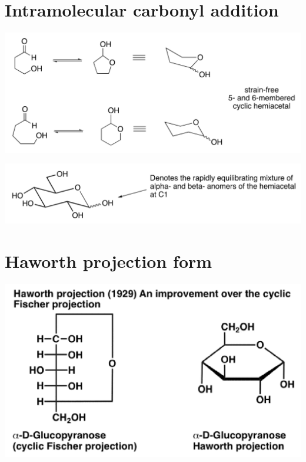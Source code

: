 \documentclass[11pt]{article}
\begin{document}
\section{Intramolecular carbonyl addition}
\label{sec:org642cb9d}
\begin{center}
\includegraphics[width=.9\linewidth]{./images/intramolecular-carbonyl-addition.png}
\end{center}
\begin{center}
\includegraphics[width=.9\linewidth]{./images/rapidly-equilibriating-symbol-explanation.png}
\end{center}
\section{Haworth projection form}
\label{sec:org02180a0}
\begin{center}
\includegraphics[width=.9\linewidth]{./images/haworth-projection.png}
\end{center}
\end{document}
